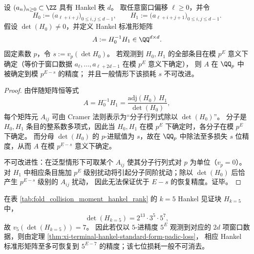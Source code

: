 \begin{theorem}\label{thm:xi-terminal-hankel-standard-form-padic-loss}
设 \((a_n)_{n\ge 0}\subset\ZZ\) 具有 Hankel 秩 \(d\)。
取任意窗口偏移 \(\ell\ge 0\)，并令
\[
H_0:=\bigl(a_{\ell+i+j}\bigr)_{0\le i,j\le d-1},\qquad
H_1:=\bigl(a_{\ell+i+j+1}\bigr)_{0\le i,j\le d-1}.
\]
假设 \(\det(H_0)\neq 0\)，并定义 Hankel 标准形矩阵
\[
A:=H_0^{-1}H_1\in\QQ^{d\times d}.
\]
固定素数 \(p\)，令
\(
s:=v_p(\det H_0)
\)。
若观测到 \(H_0,H_1\) 的全部条目在模 \(p^E\) 意义下确定（等价于窗口数据 \(a_{\ell},\dots,a_{\ell+2d-1}\) 在模 \(p^E\) 意义下确定），
则 \(A\) 在 \(\QQ_p\) 中被确定到模 \(p^{E-s}\) 的精度；
并且一般情形下该损耗 \(s\) 不可改进。
\end{theorem}
\begin{proof}
由伴随矩阵恒等式
\[
A=H_0^{-1}H_1=\frac{\mathrm{adj}(H_0)\,H_1}{\det(H_0)},
\]
每个矩阵元 \(A_{ij}\) 可由 Cramer 法则表示为“分子行列式除以 \(\det(H_0)\)”。
分子是 \(H_0,H_1\) 条目的整系数多项式，因此当 \(H_0,H_1\) 在模 \(p^E\) 下确定时，各分子在模 \(p^E\) 下确定。
而分母 \(\det(H_0)\) 的 \(p\)-进赋值为 \(s\)，故在 \(\QQ_p\) 中除法至多损失 \(s\) 位精度，从而 \(A\) 在模 \(p^{E-s}\) 意义下确定。
\par
不可改进性：在泛型情形下可取某个 \(A_{ij}\) 使其分子行列式对 \(p\) 为单位（\(v_p=0\)）。
对 \(H_1\) 中相应条目施加 \(p^E\) 级别扰动将引起分子同阶扰动；除以 \(\det(H_0)\) 后恰产生 \(p^{E-s}\) 级别的 \(A_{ij}\) 扰动，
因此无法保证优于 \(E-s\) 的恢复精度。证毕。
\end{proof}

\begin{corollary}[\texorpdfstring{$p=5$}{p=5} 的刚性阈值：七位损耗的不可消去性]\label{cor:xi-terminal-hankel-standard-form-p5-threshold}
在表 \ref{tab:fold_collision_moment_hankel_rank} 的 \(k=5\) Hankel 见证块 \(H_{k=5}\) 中，
\[
\det(H_{k=5})=2^{13}\cdot 3^5\cdot 5^7,
\]
故 \(v_5(\det(H_{k=5}))=7\)。
因此若仅以 \(5\)-进精度 \(5^E\) 观测到对应的 \(2d\) 项窗口数据，则由定理 \ref{thm:xi-terminal-hankel-standard-form-padic-loss}，
相应 Hankel 标准形矩阵至多可恢复到 \(5^{E-7}\) 的精度；该七位损耗一般不可消去。
\end{corollary}

